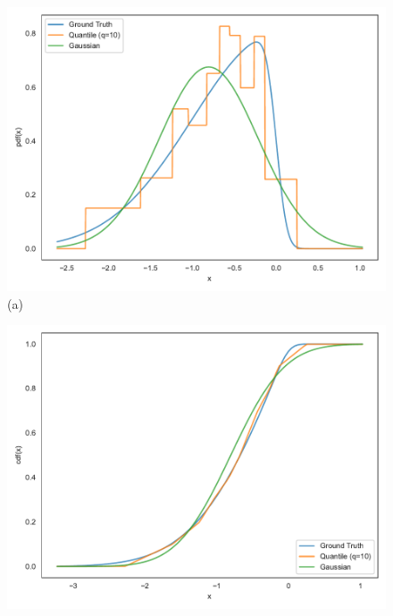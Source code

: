 \begin{landscape}
\begin{figure}[H]
  \label{fig:distest10}
  \centering
  \begin{minipage}[b]{0.4\textwidth}
    \centering
    \includegraphics[width=\linewidth]{figs/10_pdf_plot.pdf}
    \\[0.5em]
    {\small (a)}
  \end{minipage}
  \hfill
  \begin{minipage}[b]{0.4\textwidth}
    \centering
    \includegraphics[width=\linewidth]{figs/10_cdf_plot.pdf}

\end{minipage}
\end{figure}
\end{landscape}
